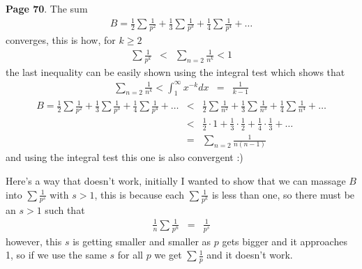 \documentclass[aps,preprint,preprintnumbers,nofootinbib,showpacs,prd]{revtex4-1}
\newcommand{\nbea}{\begin{eqnarray*}}
\newcommand{\neea}{\end{eqnarray*}}
\begin{document}
{\bf Page 70}. The sum
%
\nbea
B = \frac{1}{2} \sum\frac{1}{p^2} + \frac{1}{3} \sum\frac{1}{p^3} + \frac{1}{4} \sum\frac{1}{p^4} + \dots
\neea
%
converges, this is how, for $k \ge 2$
%
\nbea
\sum \frac{1}{p^k} & < & \sum_{n=2} \frac{1}{n^k} < 1
\neea
%
the last inequality can be easily shown using the integral test which shows that
%
\nbea
\sum_{n=2} \frac{1}{n^k} < \int_1^\infty x^{-k} dx & = & \frac{1}{k - 1}
\neea
%
%
\nbea
B = \frac{1}{2} \sum\frac{1}{p^2} + \frac{1}{3} \sum\frac{1}{p^3} + \frac{1}{4} \sum\frac{1}{p^4} + \dots & < & \frac{1}{2} \sum\frac{1}{n^2} + \frac{1}{3} \sum\frac{1}{n^3} + \frac{1}{4} \sum\frac{1}{n^4} + \dots \\
& < & \frac{1}{2} \cdot1 + \frac{1}{3} \cdot\frac{1}{2} + \frac{1}{4} \cdot \frac{1}{3} + \dots \\
& = & \sum_{n=2}\frac{1}{n(n-1)}
\neea
%
and using the integral test this one is also convergent :)

Here's a way that doesn't work, initially I wanted to show that we can massage $B$ into $\sum \frac{1}{p^s}$ with $s > 1$, this is because each $\sum \frac{1}{p^k}$ is less than one, so there must be an $s > 1$ such that 
%
\nbea
\frac{1}{n}\sum\frac{1}{p^n} & = & \frac{1}{p^s}
\neea
%
however, this $s$ is getting smaller and smaller as $p$ gets bigger and it approaches 1, so if we use the same $s$ for all $p$ we get $\sum \frac{1}{p}$ and it doesn't work.
\end{document}
